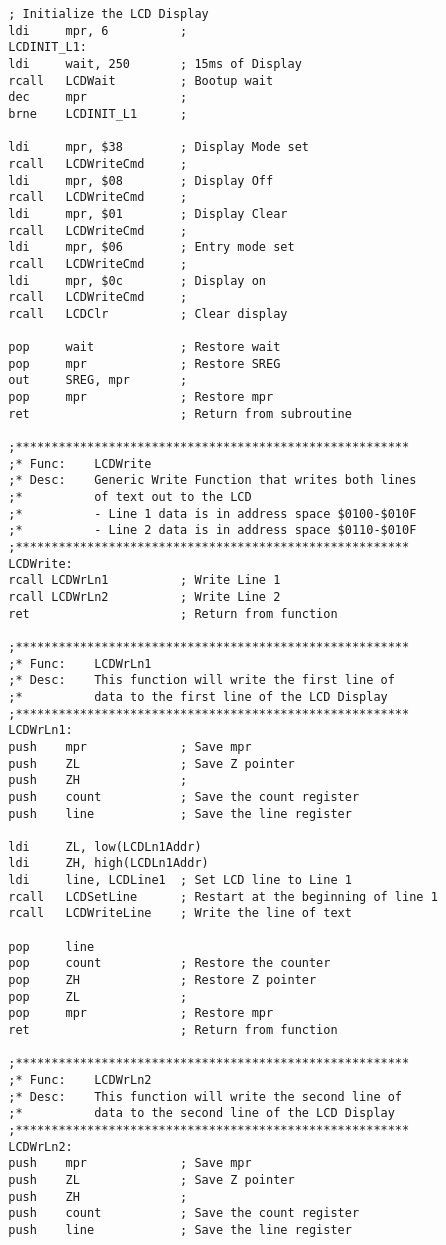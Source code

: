 \documentclass[12pt,letterpaper]{article}
\begin{document}
\begin{verbatim}
	    ; Initialize the LCD Display
	    ldi		mpr, 6			;
	    LCDINIT_L1:
	    ldi		wait, 250		; 15ms of Display
	    rcall	LCDWait			; Bootup wait
	    dec		mpr				;
	    brne	LCDINIT_L1		;
	    
	    ldi		mpr, $38		; Display Mode set
	    rcall 	LCDWriteCmd		; 
	    ldi		mpr, $08		; Display Off
	    rcall	LCDWriteCmd		;
	    ldi		mpr, $01		; Display Clear
	    rcall	LCDWriteCmd		;
	    ldi		mpr, $06		; Entry mode set
	    rcall	LCDWriteCmd		;
	    ldi		mpr, $0c		; Display on
	    rcall	LCDWriteCmd		;
	    rcall	LCDClr			; Clear display
	    
	    pop		wait			; Restore wait
	    pop		mpr				; Restore SREG
	    out		SREG, mpr		;
	    pop		mpr				; Restore mpr
	    ret						; Return from subroutine
	    
	    ;*******************************************************
	    ;* Func:	LCDWrite
	    ;* Desc:	Generic Write Function that writes both lines
	    ;*			of text out to the LCD
	    ;*			- Line 1 data is in address space $0100-$010F
	    ;*			- Line 2 data is in address space $0110-$010F
	    ;*******************************************************
	    LCDWrite:
	    rcall LCDWrLn1			; Write Line 1
	    rcall LCDWrLn2			; Write Line 2
	    ret 					; Return from function
	    
	    ;*******************************************************
	    ;* Func:	LCDWrLn1
	    ;* Desc:	This function will write the first line of 
	    ;*			data to the first line of the LCD Display
	    ;*******************************************************
	    LCDWrLn1:
	    push 	mpr				; Save mpr
	    push	ZL				; Save Z pointer
	    push	ZH				;
	    push	count			; Save the count register
	    push	line			; Save the line register
	    
	    ldi		ZL, low(LCDLn1Addr)
	    ldi		ZH, high(LCDLn1Addr)		 
	    ldi		line, LCDLine1	; Set LCD line to Line 1
	    rcall	LCDSetLine		; Restart at the beginning of line 1
	    rcall	LCDWriteLine	; Write the line of text
	    
	    pop		line
	    pop		count			; Restore the counter
	    pop		ZH				; Restore Z pointer
	    pop		ZL				;
	    pop 	mpr				; Restore mpr
	    ret						; Return from function
	    
	    ;*******************************************************
	    ;* Func:	LCDWrLn2
	    ;* Desc:	This function will write the second line of 
	    ;*			data to the second line of the LCD Display
	    ;*******************************************************
	    LCDWrLn2:
	    push 	mpr				; Save mpr
	    push	ZL				; Save Z pointer
	    push	ZH				;
	    push	count			; Save the count register
	    push	line			; Save the line register
	    

\end{verbatim}
\end{document}
